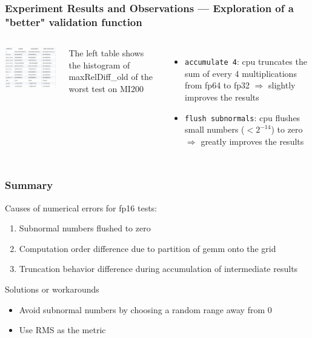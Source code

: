 \documentclass[t, pdftex, aspectratio=169]{beamer}  %
\begin{document}
\begin{frame}
  \frametitle{Experiment Results and Observations --- Exploration of a "better" validation function}
  
  \begin{columns}
    
    \includegraphics[width=3in]{better_validation}
    

    The left table shows the histogram of maxRelDiff\_old of the worst test on MI200
    \begin{itemize}
    \item \texttt{accumulate 4}: cpu truncates the sum of every 4 multiplications from fp64 to fp32
      $\Rightarrow$ slightly improves the results
    \item \texttt{flush subnormals}: cpu flushes small numbers ($<2^{-14}$) to zero
      $\Rightarrow$ greatly improves the results
    \end{itemize}
  \end{columns}
\end{frame}

\begin{frame}
  \frametitle{Summary}

  Causes of numerical errors for fp16 tests:
  \begin{enumerate}
  \item Subnormal numbers flushed to zero
  \item Computation order difference due to partition of gemm onto the grid
  \item Truncation behavior difference during accumulation of intermediate results
  \end{enumerate}
  
  Solutions or workarounds
  \begin{itemize}
  \item Avoid subnormal numbers by choosing a random range away from 0
  \item Use RMS as the metric
  \end{itemize}
\end{frame}
\end{document}
